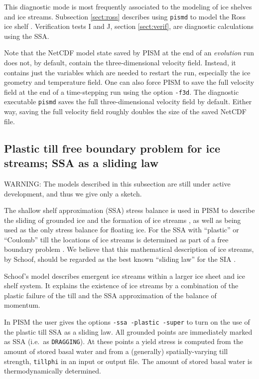\documentclass[11pt,final]{amsart}
\newcommand{\pismoptionindex}[1]{\index{options for PISM (and PETSc)!\texttt{-#1}}}
\newcommand{\intextoption}[1]{\texttt{-#1}\pismoptionindex{#1}}
\begin{document}
This diagnostic mode is most frequently associated to the modeling of ice shelves and ice streams.  Subsection \ref{sect:ross} describes using \verb|pismd| to model the Ross ice shelf \cite{MacAyealetal}.  Verification tests I and J, section \ref{sect:verif}, are diagnostic calculations using the SSA.

Note that the NetCDF model state saved by PISM at the end of an \emph{evolution} run does not, by default, contain the three-dimensional velocity field.  Instead, it contains just the variables which are needed to restart the run, especially the ice geometry and temperature field.  One can also force PISM to save the full velocity field at the end of a time-stepping run using the option \intextoption{f3d}.  The diagnostic executable \verb|pismd| saves the full three-dimensional velocity field by default.  Either way, saving the full velocity field roughly doubles the size of the saved NetCDF file.


\subsection{Plastic till free boundary problem for ice streams; SSA as a sliding law}  \label{subsect:plastic}
WARNING: The models described in this subsection are still under active development, and thus we give only a sketch.

The shallow shelf approximation (SSA) stress balance is used in PISM to describe the sliding of grounded ice and the formation of ice streams \cite{BBssasliding}, as well as being used as the only stress balance for floating ice.  For the SSA with ``plastic'' or ``Coulomb'' till the locations of ice streams is determined as part of a free boundary problem \cite{SchoofStream}.  We believe that this mathematical description of ice streams, by Schoof, should be regarded as the best known ``sliding law'' for the SIA \cite{BBssasliding}.

Schoof's model \cite{SchoofStream} describes emergent ice streams within a larger ice sheet and ice shelf system.  It explains the existence of ice streams by a combination of the plastic failure of the till and the SSA approximation of the balance of momentum.  

In PISM the user gives the options \verb|-ssa -plastic -super| to turn on the use of the plastic till SSA as a sliding law.  All grounded points are immediately marked as SSA (i.e.~as \verb|DRAGGING|).  At these points a yield stress is computed from the amount of stored basal water and from a (generally) spatially-varying till strength, \verb|tillphi| in an input or output file.  The amount of stored basal water is thermodynamically determined.
\end{document}
